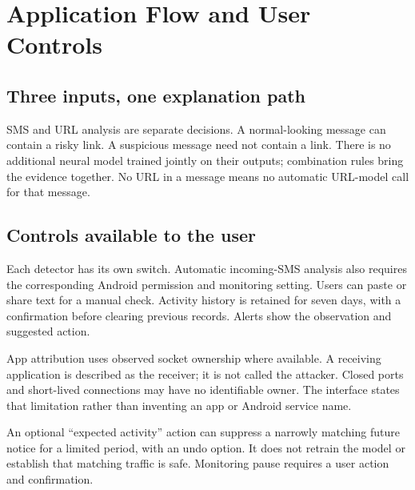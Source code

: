 \documentclass[11pt,a4paper]{article}
\newcommand{\chapterpage}[1]{\clearpage\section{#1}}
\begin{document}
\chapterpage{Application Flow and User Controls}
\subsection*{Three inputs, one explanation path}
\begin{center}
\end{center}

SMS and URL analysis are separate decisions. A normal-looking message can contain a
risky link. A suspicious message need not contain a link. There is no additional neural
model trained jointly on their outputs; combination rules bring the evidence together.
No URL in a message means no automatic URL-model call for that message.

\subsection*{Controls available to the user}
Each detector has its own switch. Automatic incoming-SMS analysis also requires the
corresponding Android permission and monitoring setting. Users can paste or share text
for a manual check. Activity history is retained for seven days, with a confirmation
before clearing previous records. Alerts show the observation and suggested action.

App attribution uses observed socket ownership where available. A receiving application
is described as the receiver; it is not called the attacker. Closed ports and short-lived
connections may have no identifiable owner. The interface states that limitation rather
than inventing an app or Android service name.

An optional ``expected activity'' action can suppress a narrowly matching future notice
for a limited period, with an undo option. It does not retrain the model or establish
that matching traffic is safe. Monitoring pause requires a user action and confirmation.
\end{document}
